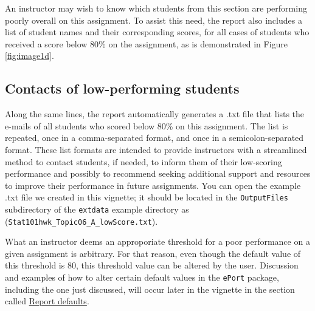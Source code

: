 \documentclass[11pt,a4paper,oldfontcommands,openany]{memoir}
\numberwithin{equation}{section} %
\begin{document}
An instructor may wish to know which students from this section are performing poorly overall on this assignment. To assist this need, the report also includes a list of student names and their corresponding scores, for all cases of students who received a score below 80\% on the assignment, as is demonstrated in Figure \ref{fig:image1d}.

\begin{center}
\captionsetup{width=0.85\textwidth}
\label{fig:image1d}
\end{center}

\subsection{Contacts of low-performing students}
\label{sec:lowPerform}

Along the same lines, the report automatically generates a .txt file that lists the e-mails of all students who scored below 80\% on this assignment. The list is repeated, once in a comma-separated format, and once in a semicolon-separated format. These list formats are intended to provide instructors with a streamlined method to contact students, if needed, to inform them of their low-scoring performance and possibly to recommend seeking additional support and resources to improve their performance in future assignments. You can open the example .txt file we created in this vignette; it should be located in the \texttt{OutputFiles} subdirectory of the \texttt{extdata} example directory as (\texttt{Stat101hwk\_Topic06\_A\_lowScore.txt}).

What an instructor deems an approporiate threshold for a poor performance on a given assignment is arbitrary. For that reason, even though the default value of this threshold is 80, this threshold value can be altered by the user. Discussion and examples of how to alter certain default values in the \texttt{ePort} package, including the one just discussed, will occur later in the vignette in the section called \hyperref[sec:repOptions]{Report defaults}.
\end{document}
